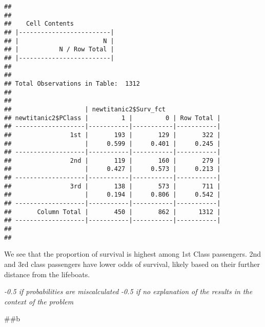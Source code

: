 \documentclass[]{article}
\newenvironment{Shaded}{\begin{snugshade}}{\end{snugshade}}
\newcommand{\DataTypeTok}[1]{\textcolor[rgb]{0.13,0.29,0.53}{#1}}
\newcommand{\KeywordTok}[1]{\textcolor[rgb]{0.13,0.29,0.53}{\textbf{#1}}}
\newcommand{\NormalTok}[1]{#1}
\newcommand{\OperatorTok}[1]{\textcolor[rgb]{0.81,0.36,0.00}{\textbf{#1}}}
\newcommand{\OtherTok}[1]{\textcolor[rgb]{0.56,0.35,0.01}{#1}}
\begin{document}
\begin{verbatim}
## 
##  
##    Cell Contents
## |-------------------------|
## |                       N |
## |           N / Row Total |
## |-------------------------|
## 
##  
## Total Observations in Table:  1312 
## 
##  
##                    | newtitanic2$Surv_fct 
## newtitanic2$PClass |         1 |         0 | Row Total | 
## -------------------|-----------|-----------|-----------|
##                1st |       193 |       129 |       322 | 
##                    |     0.599 |     0.401 |     0.245 | 
## -------------------|-----------|-----------|-----------|
##                2nd |       119 |       160 |       279 | 
##                    |     0.427 |     0.573 |     0.213 | 
## -------------------|-----------|-----------|-----------|
##                3rd |       138 |       573 |       711 | 
##                    |     0.194 |     0.806 |     0.542 | 
## -------------------|-----------|-----------|-----------|
##       Column Total |       450 |       862 |      1312 | 
## -------------------|-----------|-----------|-----------|
## 
## 
\end{verbatim}

We see that the proportion of survival is highest among 1st Class
passengers. 2nd and 3rd class passengers have lower odds of survival,
likely based on their further distance from the lifeboats.

\emph{-0.5 if probabilities are miscalculated } \emph{-0.5 if no
explanation of the results in the context of the problem}

\#\#b

\begin{Shaded}
\end{Shaded}
\end{document}
